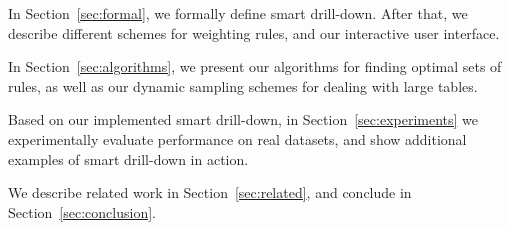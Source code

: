 \squishlist 

\item In Section~\ref{sec:formal}, we formally define smart drill-down. After that, we describe different schemes for weighting rules, and our interactive user interface.

\item In Section~\ref{sec:algorithms}, we present our algorithms for
finding optimal sets of rules, as well as our dynamic sampling schemes
for dealing with large tables.

\item Based on our implemented smart drill-down,
in Section~\ref{sec:experiments} we experimentally evaluate
performance on real datasets,
and show additional examples of smart drill-down in action.

\item We describe related work in Section~\ref{sec:related}, and conclude in Section~\ref{sec:conclusion}.
\squishend 
